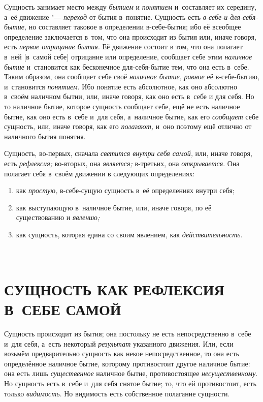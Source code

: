 Сущность занимает место между {\em бытием} и
{\em понятием} и~составляет их середину, а~её движение
"--- {\em переход} от бытия в~понятие. Сущность есть
{\em в-себе-и-для-себя-бытие,} но составляет таковое в
определении в-себе-бытия; ибо её всеобщее определение заключается в~том,
что она происходит из бытия или, иначе говоря, есть
{\em первое отрицание бытия}. Её движение состоит в
том, что она полагает в~ней [в~самой себе] отрицание или определение,
сообщает себе этим {\em наличное бытие} и~становится
как бесконечное для-себя-бытие тем, что она есть в~себе. Таким образом, она
сообщает себе своё {\em наличное бытие,}
{\em равное} её в-себе-бытию, и~становится
{\em понятием}. Ибо понятие есть абсолютное, как оно
абсолютно в~своём наличном бытии, или, иначе говоря, как оно есть в~себе и
для себя. Но то наличное бытие, которое сущность сообщает себе, ещё не есть
наличное бытие, как оно есть в~себе и~для себя, а~наличное бытие, как его
{\em сообщает} себе сущность, или, иначе говоря, как
его {\em полагают,} и~оно поэтому ещё отлично от
наличного бытия понятия.

Сущность, во-первых, сначала {\em светится внутри себя
самой,} или, иначе говоря, есть {\em рефлексия;}
во-вторых, она {\em является;} в-третьих, она
{\em открывается}. Она полагает себя в~своём движении в
следующих определениях:
\begin{enumerate}[~~~~I.]
\item как {\em простую,} в-себе-сущую сущность в~её определениях внутри себя;
\item как выступающую в~наличное бытие, или, иначе
  говоря, по её существованию и {\em явлению;}
\item как сущность, которая едина со своим
  явлением, как {\em действительность}.
\end{enumerate}

\clearpage


\part[\small СУЩНОСТЬ КАК РЕФЛЕКСИЯ В~СЕБЕ САМОЙ]%
     {\fontsize{9}{11}\selectfont{\mdseries ПЕРВЫЙ ОТДЕЛ}\\%
      \normalsize СУЩНОСТЬ КАК РЕФЛЕКСИЯ В~СЕБЕ САМОЙ}

Сущность происходит из бытия; она постольку не
есть непосредственно в~себе и~для себя, а~есть некоторый
{\em результат} указанного движения. Или, если возьмём
предварительно сущность как некое непосредственное, то она есть
определённое наличное бытие, которому противостоит другое наличное бытие:
она есть лишь {\em существенное} наличное бытие,
противостоящее {\em несущественному}. Но сущность есть
в~себе и~для себя снятое бытие; то, что ей противостоит, есть только
{\em видимость}. Но видимость есть собственное полагание сущности.

